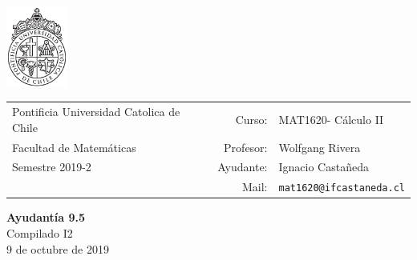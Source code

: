 \documentclass[12pt]{article}
\makeatletter
\newcommand{\ayudantia}{{\sc Ayudantía 9.5}}
\newcommand{\tituloayu}{Compilado I2}
\newcommand{\fecha}{9 de octubre de 2019}
\newcommand{\sigla}{MAT1620}
\newcommand{\nombre}{Cálculo II}
\newcommand{\profesor}{Wolfgang Rivera}
\newcommand{\ano}{2019}
\newcommand{\semestre}{2}
\newcommand{\mail}{mat1620@ifcastaneda.cl}
\makeatother
\begin{document}
\thispagestyle{empty}

\begin{minipage}{2cm}
	\includegraphics[width=2cm]{../../../../img/logo.pdf}
	\vspace{0.5cm}
\end{minipage}
\begin{minipage}{\linewidth}
	\begin{tabular}{lrl}
		{\scriptsize\sc Pontificia Universidad Catolica de Chile} & \hspace*{0.7in}Curso: &
		\sigla  - \nombre\\
		{\sc Facultad de Matemáticas}&
		Profesor: & \profesor \\
		{\sc Semestre \ano-\semestre} & Ayudante: & {Ignacio Castañeda}\\
		& {Mail:} & \texttt{\mail}
	\end{tabular}
\end{minipage}

\vspace{-10mm}
\begin{center}
	{\LARGE\bf \ayudantia}\\
	\vspace{0.1cm}
	{\tituloayu}\\
	\vspace{0.1cm}
	\fecha\\
	\vspace{0.4cm}
\end{center}
\end{document}
